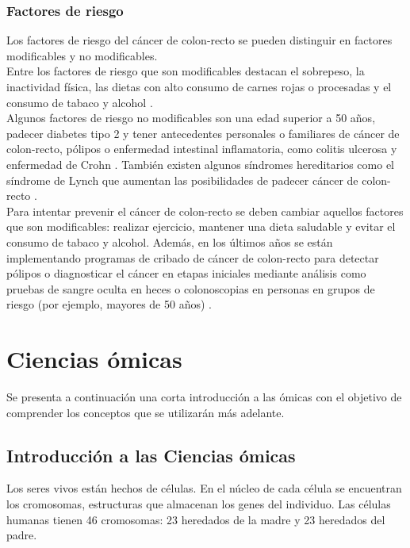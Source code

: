\subsubsection{Factores de riesgo}

Los factores de riesgo del cáncer de colon-recto  se pueden distinguir en factores modificables y no modificables.\\

Entre los factores de riesgo que son modificables destacan el sobrepeso, la inactividad física, las dietas con alto consumo de carnes rojas o procesadas y el consumo de tabaco y alcohol \cite{AmericanCancerSociety2020}.\\

Algunos factores de riesgo no modificables son una edad superior a 50 años, padecer diabetes tipo 2 y tener antecedentes personales o familiares de cáncer de colon-recto, pólipos o enfermedad intestinal inflamatoria, como colitis ulcerosa y enfermedad de Crohn \cite{AmericanCancerSociety2020}. También existen algunos síndromes hereditarios como el síndrome de Lynch que aumentan las posibilidades de padecer cáncer de colon-recto \cite{Lynch2003}.\\

Para intentar prevenir el cáncer de colon-recto se deben cambiar aquellos factores que son modificables: realizar ejercicio, mantener una dieta saludable y evitar el consumo de tabaco y alcohol. Además, en los últimos años se están implementando programas de cribado de cáncer de colon-recto para detectar pólipos o diagnosticar el cáncer en etapas iniciales mediante análisis como pruebas de sangre oculta en heces o colonoscopias en personas en grupos de riesgo (por ejemplo, mayores de 50 años) \cite{Levin2008}.


\section{Ciencias ómicas}

Se presenta a continuación una corta introducción a las ómicas con el objetivo de comprender los conceptos que se utilizarán más adelante.

\subsection{Introducción a las Ciencias ómicas}

Los seres vivos están hechos de células. En el núcleo de cada célula se encuentran los cromosomas, estructuras que almacenan los genes del individuo. Las células humanas tienen 46 cromosomas: 23 heredados de la madre y 23 heredados del padre.\\

